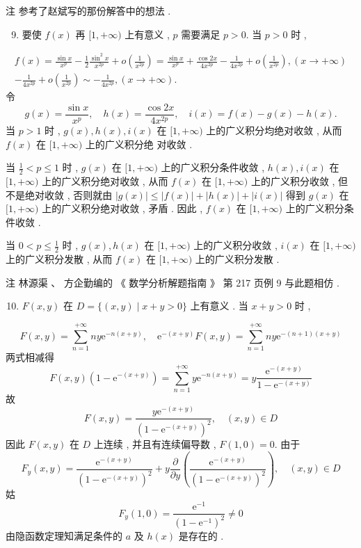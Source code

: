 \documentclass[10pt]{article}
\begin{document}
 注   参考了赵斌写的那份解答中的想法 .

\begin{enumerate}
  \setcounter{enumi}{8}
  \item  要使  $f(x)$  再  $[1,+\infty)$  上有意义 , $p$  需要满足  $p>0$.  当  $p>0$  时 ,
\end{enumerate}
$$
\begin{gathered}
f(x)=\frac{\sin x}{x^{p}}-\frac{1}{2} \frac{\sin ^{2} x}{x^{2 p}}+o\left(\frac{1}{x^{2 p}}\right)=\frac{\sin x}{x^{p}}+\frac{\cos 2 x}{4 x^{2 p}}-\frac{1}{4 x^{2 p}}+o\left(\frac{1}{x^{2 p}}\right),(x \rightarrow+\infty) \\
-\frac{1}{4 x^{2 p}}+o\left(\frac{1}{x^{2 p}}\right) \sim-\frac{1}{4 x^{2 p}},(x \rightarrow+\infty) .
\end{gathered}
$$
 令 
$$
g(x)=\frac{\sin x}{x^{p}}, \quad h(x)=\frac{\cos 2 x}{4 x^{2 p}}, \quad i(x)=f(x)-g(x)-h(x) .
$$
 当  $p>1$  时 , $g(x), h(x), i(x)$  在  $[1,+\infty)$  上的广义积分均绝对收敛 ,  从而  $f(x)$  在  $[1,+\infty)$  上的广义积分绝   对收敛 .

 当  $\frac{1}{2}<p \leqslant 1$  时 , $g(x)$  在  $[1,+\infty)$  上的广义积分条件收敛 , $h(x), i(x)$  在  $[1,+\infty)$  上的广义积分绝对收敛 ,  从而  $f(x)$  在  $[1,+\infty)$  上的广义积分收敛 ,  但不是绝对收敛 ,  否则就由  $|g(x)| \leqslant|f(x)|+|h(x)|+|i(x)|$  得到  $g(x)$  在  $[1,+\infty)$  上的广义积分绝对收敛 ,  矛盾 .  因此 , $f(x)$  在  $[1,+\infty)$  上的广义积分条件收敛 .

 当  $0<p \leqslant \frac{1}{2}$  时 , $g(x), h(x)$  在  $[1,+\infty)$  上的广义积分收敛 , $i(x)$  在  $[1,+\infty)$  上的广义积分发散 ,  从而  $f(x)$  在  $[1,+\infty)$  上的广义积分发散 .

 注   林源渠 、 方企勤编的 《 数学分析解题指南 》 第  217  页例  9  与此题相仿 .

\begin{enumerate}
  \setcounter{enumi}{9}
  \item $F(x, y)$  在  $D=\{(x, y) \mid x+y>0\}$  上有意义 .  当  $x+y>0$  时 ,
\end{enumerate}
$$
F(x, y)=\sum_{n=1}^{+\infty} n y \mathrm{e}^{-n(x+y)}, \quad \mathrm{e}^{-(x+y)} F(x, y)=\sum_{n=1}^{+\infty} n y \mathrm{e}^{-(n+1)(x+y)}
$$
 两式相减得 
$$
F(x, y)\left(1-\mathrm{e}^{-(x+y)}\right)=\sum_{n=1}^{+\infty} y \mathrm{e}^{-n(x+y)}=y \frac{\mathrm{e}^{-(x+y)}}{1-\mathrm{e}^{-(x+y)}}
$$
 故 
$$
F(x, y)=\frac{y \mathrm{e}^{-(x+y)}}{\left(1-\mathrm{e}^{-(x+y)}\right)^{2}}, \quad(x, y) \in D
$$
 因此  $F(x, y)$  在  $D$  上连续 ,  并且有连续偏导数 , $F(1,0)=0$.  由于 
$$
F_{y}(x, y)=\frac{\mathrm{e}^{-(x+y)}}{\left(1-\mathrm{e}^{-(x+y)}\right)^{2}}+y \frac{\partial}{\partial y}\left(\frac{\mathrm{e}^{-(x+y)}}{\left(1-\mathrm{e}^{-(x+y)}\right)^{2}}\right), \quad(x, y) \in D
$$
 姑 
$$
F_{y}(1,0)=\frac{\mathrm{e}^{-1}}{\left(1-\mathrm{e}^{-1}\right)^{2}} \neq 0
$$
 由隐函数定理知满足条件的  $a$  及  $h(x)$  是存在的 .
\end{document}
